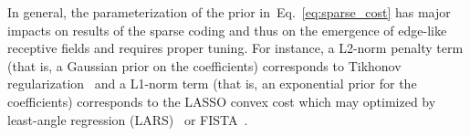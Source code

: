 \documentclass[letterpaper,final,conference,10pt]{IEEEtran}
\newcommand{\citep}[1]{\cite{#1}}
\newcommand{\coef}{\mathbf{a}} %
\newcommand{\image}{\mathbf{y}} %
\newcommand{\dico}{\Phi} %
\newcommand{\seeEq}[1]{Eq.~\ref{eq:#1}}%
\begin{document}
In general, the parameterization of the prior in~\seeEq{sparse_cost} has major impacts on results of the sparse coding and thus on the emergence of edge-like receptive fields and requires proper tuning. For instance, a L2-norm penalty term (that is, a Gaussian prior on the coefficients) corresponds to Tikhonov regularization~\citep{Tikhonov77} and a L1-norm term (that is, an exponential prior for the coefficients) corresponds to the LASSO convex cost which may optimized by least-angle regression (LARS)~\citep{efron2004least} or FISTA~\citep{beck2009fast}. %
\end{document}
